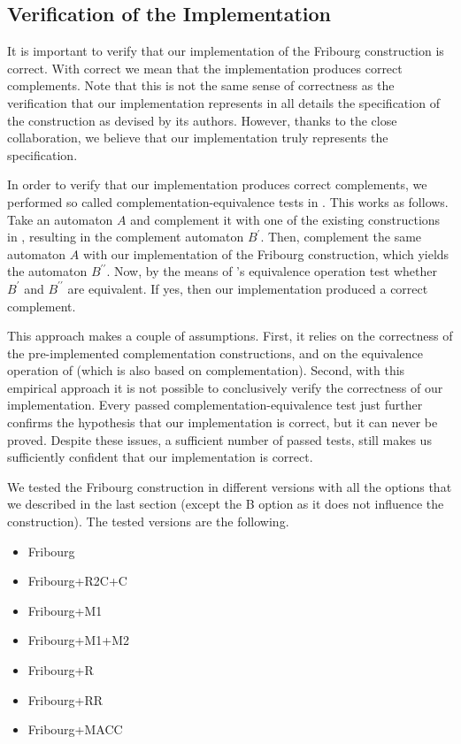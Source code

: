 \subsection{Verification of the Implementation}
\label{4_verification}
It is important to verify that our implementation of the Fribourg construction is correct. With correct we mean that the implementation produces correct complements. Note that this is not the same sense of correctness as the verification that our implementation represents in all details the specification of the construction as devised by its authors. However, thanks to the close collaboration, we believe that our implementation truly represents the specification.

In order to verify that our implementation produces correct complements, we performed so called complementation-equivalence tests in \goal. This works as follows. Take an automaton $A$ and complement it with one of the existing constructions in \goal, resulting in the complement automaton $B^\prime$. Then, complement the same automaton $A$ with our implementation of the Fribourg construction, which yields the automaton $B^{\prime\prime}$. Now, by the means of \goal's equivalence operation test whether $B^\prime$ and $B^{\prime\prime}$ are equivalent. If yes, then our implementation produced a correct complement.

This approach makes a couple of assumptions. First, it relies on the correctness of the pre-implemented complementation constructions, and on the equivalence operation of \goal{} (which is also based on complementation). Second, with this empirical approach it is not possible to conclusively verify the correctness of our implementation. Every passed complementation-equivalence test just further confirms the hypothesis that our implementation is correct, but it can never be proved. Despite these issues, a sufficient number of passed tests, still makes us sufficiently confident that our implementation is correct.

We tested the Fribourg construction in different versions with all the options that we described in the last section (except the B option as it does not influence the construction). The tested versions are the following.
\begin{itemize}
\item Fribourg
\item Fribourg+R2C+C
\item Fribourg+M1
\item Fribourg+M1+M2
\item Fribourg+R
\item Fribourg+RR
\item Fribourg+MACC
\end{itemize}

